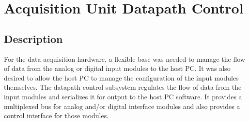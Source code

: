
\section[Datapath Control]{Acquisition Unit Datapath Control}
\subsection{Description}
For the data acquisition hardware, a flexible base was needed to manage the flow of data from the 
analog or digital input modules to the host PC. It was also desired to allow the host PC to manage 
the configuration of the input modules themselves. 
The datapath control subsystem regulates the flow of data from the input modules
 and serializes it for output to the host PC software. It provides a multiplexed bus for analog and/or digital interface modules and also provides a control interface for those modules.

